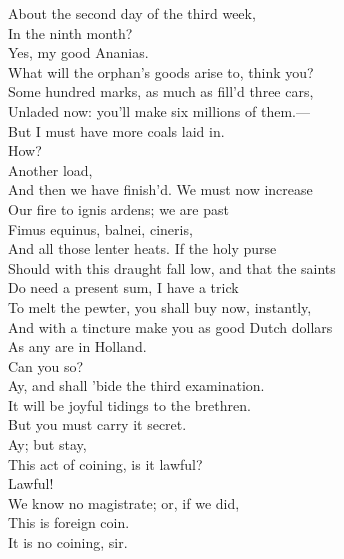 \documentclass[a4paper,oneside]{memoir}
\begin{document}
\begin{drama*}
\ananiasspeaks About the second day of the third week,\\
In the ninth month?\\
\subtlespeaks {} Yes, my good Ananias.\\
\tribulationspeaks What will the orphan's goods arise to, think you?\\
\subtlespeaks Some hundred marks, as much as fill'd three cars,\\
Unladed now: you'll make six millions of them.---\\
But I must have more coals laid in.\\
\tribulationspeaks {} How?\\
\subtlespeaks {} Another load,\\
And then we have finish'd. We must now increase\\
Our fire to ignis ardens; we are past\\
Fimus equinus, balnei, cineris,\\
And all those lenter heats. If the holy purse\\
Should with this draught fall low, and that the saints\\
Do need a present sum, I have a trick\\
To melt the pewter, you shall buy now, instantly,\\
And with a tincture make you as good Dutch dollars\\
As any are in Holland.\\
\tribulationspeaks {} Can you so?\\
\subtlespeaks Ay, and shall 'bide the third examination.\\
\ananiasspeaks It will be joyful tidings to the brethren.\\
\subtlespeaks But you must carry it secret.\\
\tribulationspeaks {} Ay; but stay,\\
This act of coining, is it lawful?\\
\ananiasspeaks {} Lawful!\\
We know no magistrate; or, if we did,\\
This is foreign coin.\\
\subtlespeaks {} It is no coining, sir.\\

\end{drama*}
\end{document}
